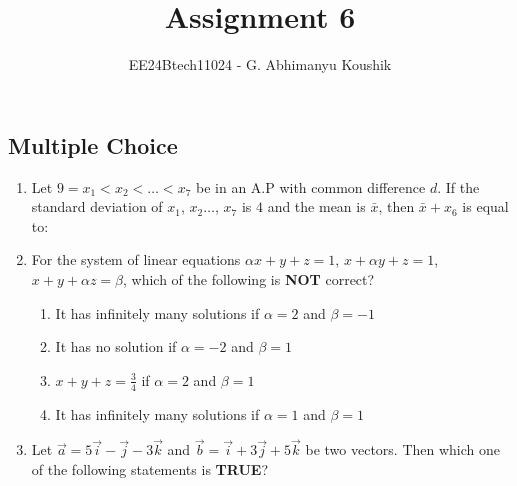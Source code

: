 \documentclass[journal,12pt,onecolumn]{IEEEtran}
\theoremstyle{remark}
\begin{document}
\title{Assignment 6}
\author{EE24Btech11024 - G. Abhimanyu Koushik}
\maketitle
\renewcommand{\thefigure}{\theenumi}
\renewcommand{\thetable}{\theenumi}
\subsection{Multiple Choice}
\begin{enumerate}

\item Let $9=x_1<x_2<\dots <x_7$ be in an A.P with common difference $d$. If the standard deviation of $x_1$, $x_2\dots$, $x_7$ is $4$ and the mean is $\bar{x}$, then $\bar{x}+x_6$ is equal to:

\hfill{}
\begin{enumerate}
\end{enumerate}

\item For the system of linear equations $\alpha x+y+z=1$, $x+\alpha y+z=1$, $x+y+\alpha z=\beta$, which of the following is \textbf{NOT} correct?

\hfill{}
\begin{enumerate}
\item It has infinitely many solutions if $\alpha=2$ and $\beta=-1$
\item It has no solution if $\alpha=-2$ and $\beta=1$
\item $x+y+z=\frac{3}{4}$ if $\alpha=2$ and $\beta=1$
\item It has infinitely many solutions if $\alpha=1$ and $\beta=1$
\end{enumerate}

\item Let $\vec{a}=5\vec{i}-\vec{j}-3\vec{k}$ and $\vec{b}=\vec{i}+3\vec{j}+5\vec{k}$ be two vectors. Then which one of the following statements is \textbf{TRUE}?


\end{enumerate}
\end{document}
